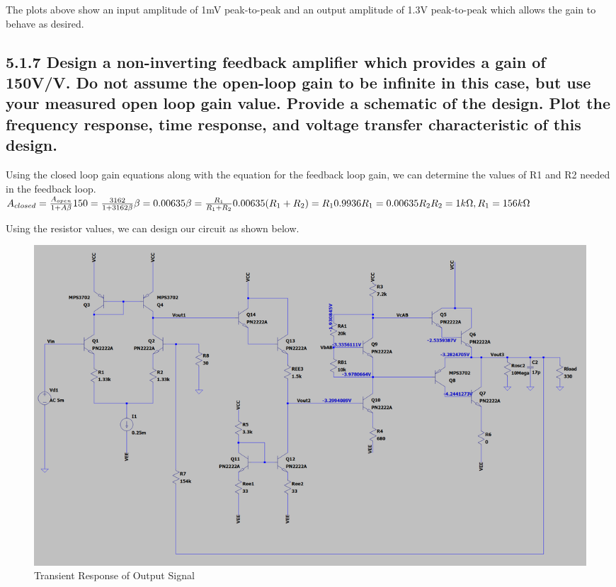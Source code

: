 \documentclass[12pt]{article}
\begin{document}
The plots above show an input amplitude of 1mV peak-to-peak and an output amplitude of 1.3V peak-to-peak which allows the gain to behave as desired.

\subsection*{5.1.7 Design a non-inverting feedback amplifier which provides a gain of 150V/V. 
Do not assume the open-loop gain to be infinite in this case, but use your measured open loop 
gain value. Provide a schematic of the design. Plot the frequency response, time response, and 
voltage transfer characteristic of this design. }

Using the closed loop gain equations along with the equation for the feedback loop gain, we can determine the values of R1 and R2 needed in the feedback loop. \\


$A_{closed}  = \frac{A_{open}}{1 + A\beta}\\
\\
150 = \frac{3162}{1 + 3162\beta}\\
\\
\beta = 0.00635\\
\\
\beta = \frac{R_1}{R_1 + R_2}\\
\\
0.00635(R_1 + R_2) = R_1\\
\\
0.9936R_1 = 0.00635R_2\\
\\
R_2 = 1k\Omega, R_1 = 156k\Omega
$

Using the resistor values, we can design our circuit as shown below.

\begin{figure}[H]
    \centering
    \includegraphics[width=1.1\textwidth]{feedback.PNG}
    \caption{Transient Response of Output Signal}
\end{figure}
\end{document}

